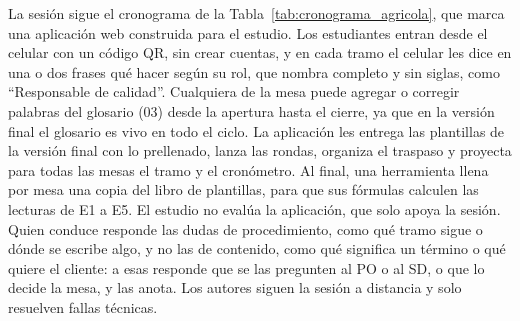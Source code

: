 \documentclass[12pt,letterpaper,oneside]{report}
\begin{document}
La sesión sigue el cronograma de la Tabla~\ref{tab:cronograma_agricola}, que
marca una aplicación web construida para el estudio. Los estudiantes entran
desde el celular con un código QR, sin crear cuentas, y en cada tramo el celular
les dice en una o dos frases qué hacer según su rol, que nombra completo y sin
siglas, como ``Responsable de calidad''. Cualquiera de la mesa puede agregar o
corregir palabras del glosario (03) desde la apertura hasta el cierre, ya que en
la versión final el glosario es vivo en todo el ciclo. La aplicación les entrega
las plantillas de la versión final con lo prellenado, lanza las rondas,
organiza el traspaso y proyecta para todas las mesas el tramo y el cronómetro.
Al final, una herramienta llena por mesa una copia del libro de plantillas, para
que sus fórmulas calculen las lecturas de E1 a E5. El estudio no evalúa la
aplicación, que solo apoya la sesión. Quien conduce responde las dudas de
procedimiento, como qué tramo sigue o dónde se escribe algo, y no las de
contenido, como qué significa un término o qué quiere el cliente: a esas
responde que se las pregunten al PO o al SD, o que lo decide la mesa, y las
anota. Los autores siguen la sesión a distancia y solo resuelven fallas
técnicas.
\end{document}
